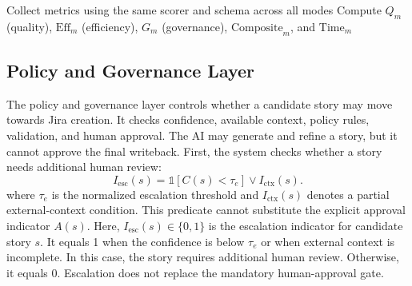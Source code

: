 \documentclass[manuscript,review]{acmart}
\begin{document}
\begin{algorithm}[H]
\DontPrintSemicolon
\footnotesize
\caption{Ablation-Mode Execution for B0/B1/B2/B3 Comparison}
\label{alg:ablation-exec}
Collect metrics using the same scorer and schema across all modes\;
Compute $Q_m$ (quality), $\mathrm{Eff}_m$ (efficiency), $G_m$ (governance), $\mathrm{Composite}_m$, and $\mathrm{Time}_m$\;
\;
\end{algorithm}

\subsection{Policy and Governance Layer}

The policy and governance layer controls whether a candidate story may move towards Jira creation. It checks confidence, available context, policy rules, validation, and human approval. The AI may generate and refine a story, but it cannot approve the final writeback.
First, the system checks whether a story needs additional human review:
\begin{equation}
I_{\mathrm{esc}}(s)
= \mathbb{1}[C(s) < \tau_e] \lor I_{\mathrm{ctx}}(s).
\end{equation}
where $\tau_e$ is the normalized escalation threshold and $I_{\text{ctx}}(s)$ denotes a partial external-context condition. This predicate cannot substitute the explicit approval indicator $A(s)$. Here, $I_{\mathrm{esc}}(s)\in\{0,1\}$ is the escalation indicator for candidate story $s$. It equals 1 when the confidence is below $\tau_e$ or when external context is incomplete. In this case, the story requires additional human review. Otherwise, it equals 0. Escalation does not replace the mandatory human-approval gate.
\end{document}
